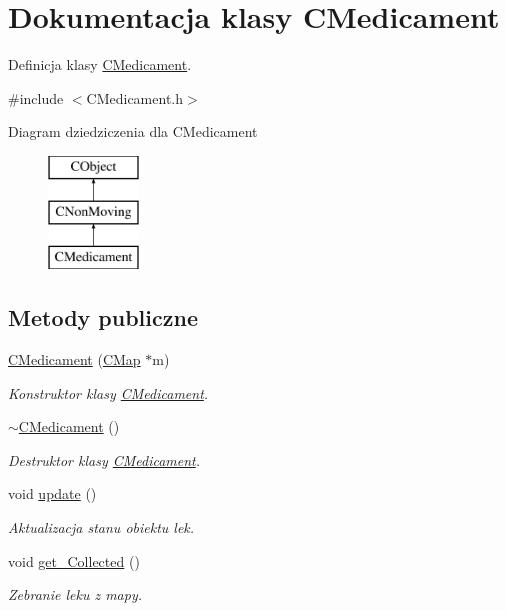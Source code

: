 \hypertarget{class_c_medicament}{}\section{Dokumentacja klasy C\+Medicament}
\label{class_c_medicament}


Definicja klasy \mbox{\hyperlink{class_c_medicament}{C\+Medicament}}.  




{\ttfamily \#include $<$C\+Medicament.\+h$>$}

Diagram dziedziczenia dla C\+Medicament\begin{figure}[H]
\begin{center}
\leavevmode
\includegraphics[height=3.000000cm]{class_c_medicament}
\end{center}
\end{figure}
\subsection*{Metody publiczne}
\begin{DoxyCompactItemize}
\item 
\mbox{\hyperlink{class_c_medicament_a3361f6e6745b0b4888e3f8060dd49042}{C\+Medicament}} (\mbox{\hyperlink{class_c_map}{C\+Map}} $\ast$m)
\begin{DoxyCompactList}\small\item\em Konstruktor klasy \mbox{\hyperlink{class_c_medicament}{C\+Medicament}}. \end{DoxyCompactList}\item 
\mbox{\hyperlink{class_c_medicament_ac9e1c8510a87d46e9c9469166a896bb8}{$\sim$\+C\+Medicament}} ()
\begin{DoxyCompactList}\small\item\em Destruktor klasy \mbox{\hyperlink{class_c_medicament}{C\+Medicament}}. \end{DoxyCompactList}\item 
void \mbox{\hyperlink{class_c_medicament_a3568bc88e5fa9db63e82fcad13ce90eb}{update}} ()
\begin{DoxyCompactList}\small\item\em Aktualizacja stanu obiektu lek. \end{DoxyCompactList}\item 
void \mbox{\hyperlink{class_c_medicament_a6db7f174a35b1d89c86cd415b0bf1708}{get\+\_\+\+Collected}} ()
\begin{DoxyCompactList}\small\item\em Zebranie leku z mapy. \end{DoxyCompactList}\end{DoxyCompactItemize}
